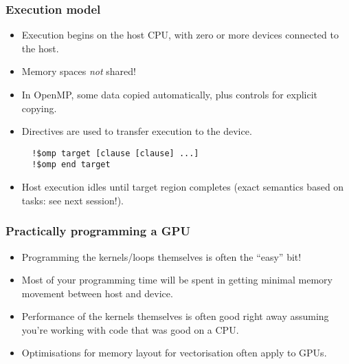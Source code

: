 \documentclass[aspectratio=169]{beamer}
\begin{document}
\begin{frame}[fragile]
\frametitle{Execution model}
\begin{itemize}
  \item Execution begins on the host CPU, with zero or more devices connected to the host.
  \item Memory spaces \emph{not} shared!
  \item In OpenMP, some data copied automatically, plus controls for explicit copying.
  \item Directives are used to transfer execution to the device.
  \begin{verbatim}
  !$omp target [clause [clause] ...]
  !$omp end target
  \end{verbatim}
  \item Host execution idles until target region completes (exact semantics based on tasks: see next session!).
\end{itemize}

\vfill

\begin{center}
\end{center}
\end{frame}

\begin{frame}
\frametitle{Practically programming a GPU}
\begin{itemize}
  \item Programming the kernels/loops themselves is often the ``easy'' bit!
  \item Most of your programming time will be spent in getting minimal memory movement between host and device.
  \item Performance of the kernels themselves is often good right away assuming you're working with code that was good on a CPU.
  \item Optimisations for memory layout for vectorisation often apply to GPUs.
\end{itemize}

\end{frame}
\end{document}
